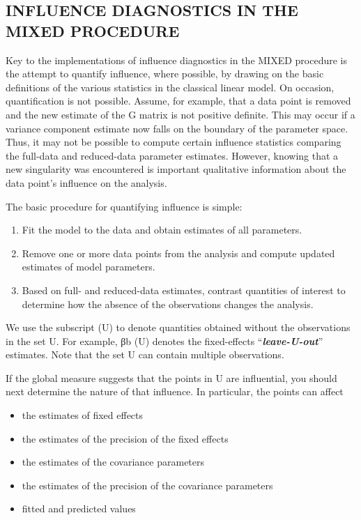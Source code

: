 \documentclass[Main.tex]{subfiles}
\begin{document}
	\subsection*{INFLUENCE DIAGNOSTICS IN THE MIXED PROCEDURE}
	Key to the implementations of influence diagnostics in the MIXED procedure is the attempt to quantify
	influence, where possible, by drawing on the basic definitions of the various statistics in the classical linear
	model. On occasion, quantification is not possible. Assume, for example, that a data point is removed
	and the new estimate of the G matrix is not positive definite. This may occur if a variance component
	estimate now falls on the boundary of the parameter space. Thus, it may not be possible to compute certain
	influence statistics comparing the full-data and reduced-data parameter estimates. However, knowing that
	a new singularity was encountered is important qualitative information about the data point’s influence on
	the analysis.
	
	The basic procedure for quantifying influence is simple:
	
	\begin{enumerate}
		\item Fit the model to the data and obtain estimates of all parameters.
		\item Remove one or more data points from the analysis and compute updated estimates of model parameters.
		\item Based on full- and reduced-data estimates, contrast quantities of interest to determine how the absence
		of the observations changes the analysis.
	\end{enumerate}
	We use the subscript (U) to denote quantities obtained without the observations in the set U. For example,
	βb
	(U) denotes the fixed-effects “\textit{\textbf{leave-U-out}}” estimates. Note that the set U can contain multiple observations.
	
	
	If the global measure suggests that the points in U are influential, you should next determine the nature of
	that influence. In particular, the points can affect
	\begin{itemize}
		\item the estimates of fixed effects
		\item the estimates of the precision of the fixed effects
		\item the estimates of the covariance parameters
		\item the estimates of the precision of the covariance parameters
		\item fitted and predicted values
	\end{itemize}
	
\end{document}
